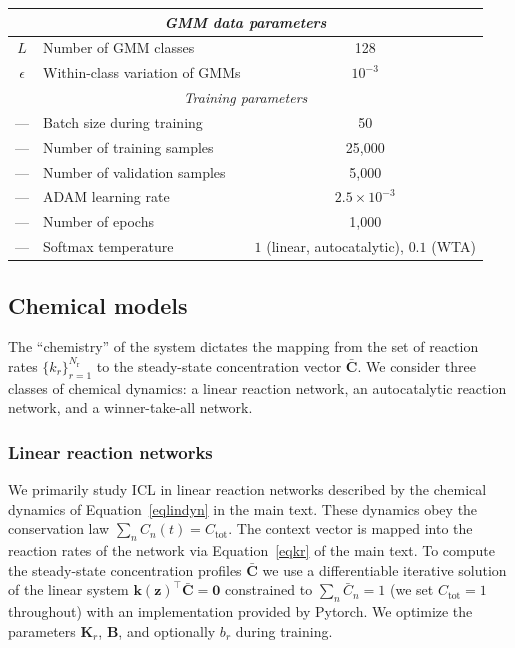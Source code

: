 \documentclass[%
reprint,
superscriptaddress,
amsmath,amssymb,
aps,
]{revtex4-2}
\begin{document}
\begin{onecolumngrid}
\begin{table}[h]
\begin{tabular}{|c|l|c|}
				\multicolumn{3}{|c|}{\textit{GMM data parameters}} \\
				\hline
				$L$ & Number of GMM classes & 128 \\
				$\epsilon$ & Within-class variation of GMMs & $10^{-3}$ \\
				\hline
				
				\multicolumn{3}{|c|}{\textit{Training parameters}} \\
				\hline
				--- & Batch size during training & 50 \\
				--- & Number of training samples & 25{,}000 \\
				--- & Number of validation samples & 5{,}000 \\
				--- & ADAM learning rate & $2.5 \times 10^{-3}$ \\
				--- & Number of epochs & 1{,}000 \\
				--- & Softmax temperature & $1$ (linear, autocatalytic), $0.1$ (WTA) \\
				\hline
				
			\end{tabular}
			\label{tab:parameters}
		\end{table}
		
		
		\subsection{Chemical models}\label{SIsec:models}
		The ``chemistry'' of the system dictates the mapping from the set of reaction rates $\{k_r\}_{r = 1}^{N_\text{r}}$ to the steady-state concentration vector $\bar{\mathbf{C}}$.  We consider three classes of chemical dynamics: a linear reaction network, an autocatalytic reaction network, and a winner-take-all network.  
		
		\subsubsection{Linear reaction networks}\label{FirstOrderModel}
		We primarily study ICL in linear reaction networks described by the chemical dynamics of Equation~\ref{eqlindyn} in the main text.  These dynamics obey the conservation law $\sum_n C_n(t) = C_\text{tot}$.  The context vector is mapped into the reaction rates of the network via Equation~\ref{eqkr} of the main text.  To compute the steady-state concentration profiles $\bar{\mathbf{C}}$ we use a differentiable iterative solution of the linear system $\mathbf{k}(\mathbf{z})^\intercal\bar{\mathbf{C}} = \mathbf{0}$ constrained to $\sum_n\bar{C}_n = 1$ (we set $C_\text{tot} = 1$ throughout) with an implementation provided by Pytorch.  We optimize the parameters $\mathbf{K}_r$, $\mathbf{B}$, and optionally $b_r$ during training.  
		

\end{onecolumngrid}
\end{document}
